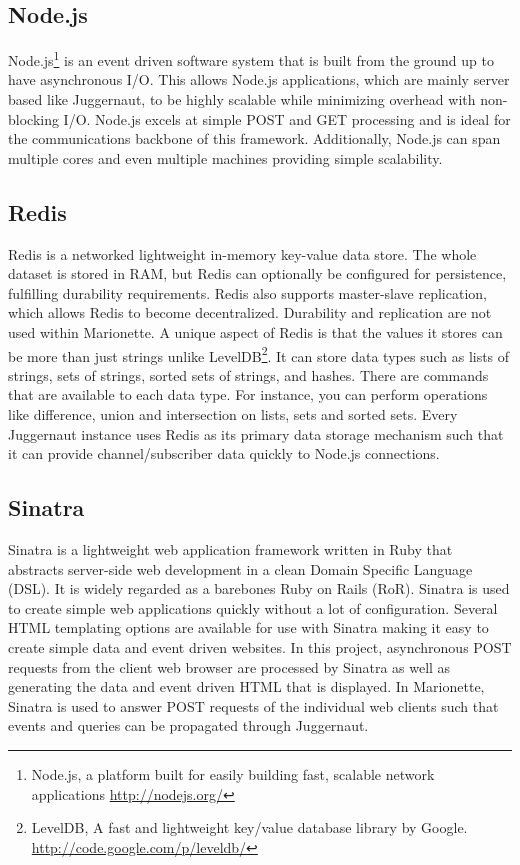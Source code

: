 \documentclass[12pt]{report}	%
\theoremstyle{definition}
\theoremstyle{remark}
\begin{document}
\subsection{Node.js}

Node.js\footnote{Node.js, a platform built for easily building fast, 
scalable network applications \linebreak \url{http://nodejs.org/}} is an event 
driven software system that is built from the
ground up to have asynchronous I/O. This allows Node.js applications,
which are mainly server based like Juggernaut, to be highly scalable while minimizing
overhead with non-blocking I/O. Node.js excels at simple POST and GET
processing and is ideal for the communications backbone of this
framework. Additionally, Node.js can span multiple cores and even
multiple machines providing simple scalability.

\subsection{Redis}

Redis is a networked lightweight in-memory key-value data store. The
whole dataset is stored in RAM, but Redis can optionally be configured
for persistence, fulfilling durability requirements. Redis also supports
master-slave replication, which allows Redis to become decentralized. 
Durability and replication are not used within Marionette. A
unique aspect of Redis is that the values it stores can be more than
just strings unlike LevelDB\footnote{LevelDB, A fast and lightweight key/value 
database library by Google. \linebreak \url{http://code.google.com/p/leveldb/}}. 
It can store data types such as lists of strings, sets of
strings, sorted sets of strings, and hashes. There are commands that are
available to each data type. For instance, you can perform operations
like difference, union and intersection on lists, sets and sorted sets.
Every Juggernaut instance uses Redis as its primary data storage mechanism such that it
can provide channel/subscriber data quickly to Node.js connections.

\subsection{Sinatra}

Sinatra is a lightweight web application framework written in Ruby that abstracts
server-side web development in a clean Domain Specific Language (DSL).
It is widely regarded as a barebones Ruby on Rails (RoR).
Sinatra is used to create simple web applications quickly without a lot of configuration.
Several HTML templating options are available for use with Sinatra
making it easy to create simple data and event driven websites. In this
project, asynchronous POST requests from the client web browser are
processed by Sinatra as well as generating the data and event driven
HTML that is displayed.  In Marionette, Sinatra is used to answer POST requests
of the individual web clients such that events and queries can be propagated through Juggernaut.
\end{document}

